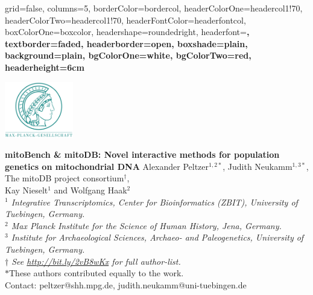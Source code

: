 \documentclass[a0paper,portrait]{baposter}
\begin{document}

\begin{poster}{
	grid=false,
	columns=5,
	borderColor=bordercol,
	headerColorOne=headercol1!70,%
	headerColorTwo=headercol1!70,%
	headerFontColor=headerfontcol,
	boxColorOne=boxcolor,
	headershape=roundedright,
	headerfont=\large\sf\bf,
	textborder=faded,%
	headerborder=open,
  	boxshade=plain,
	background=plain,
	bgColorOne=white,
	bgColorTwo=red,
	headerheight=6cm
}
{

	\includegraphics[width=3cm]{figures/Max-Planck-Gesellschaft.png}

}
{\Large\bf
	mitoBench \& mitoDB: Novel interactive methods for population genetics on mitochondrial DNA
}
{
	\vspace{1em} Alexander Peltzer$^{1,2*}$, Judith Neukamm$^{1,3*}$, The mitoDB project consortium$^\dagger$,\\ Kay Nieselt$^{1}$ and Wolfgang Haak$^{2}$\\
	{\footnotesize \textit{$^1$ Integrative Transcriptomics, Center for Bioinformatics (ZBIT), University of Tuebingen, Germany.\\
	$^2$ Max Planck Institute for the Science of Human History, Jena, Germany.\\
	$^3$ Institute for Archaeological Sciences, Archaeo- and Paleogenetics, University of Tuebingen, Germany.\\
	$\dagger$ See \url{http://bit.ly/2vB8wKx} for full author-list.}\\
	$*$These authors contributed equally to the work. \\
	\vspace{1em}
	Contact: peltzer@shh.mpg.de, judith.neukamm@uni-tuebingen.de
	}
}
{

}
\end{poster}
\end{document}
